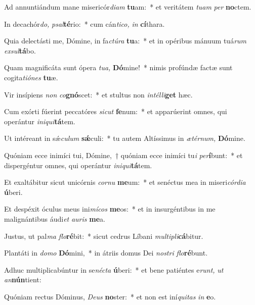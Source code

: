 \item Ad annuntiándum mane misericór\textit{diam} \textbf{tu}am:~* et veritátem \textit{tuam} \textit{per} \textbf{no}ctem.
\item In decachór\textit{do,} \textit{psal}\textbf{té}rio:~* cum cán\textit{tico,} \textit{in} \textbf{cí}thara.
\item Quia delectásti me, Dómine, in fa\textit{ctúra} \textbf{tu}a:~* et in opéribus mánuum tuá\textit{rum} \textit{exsul}\textbf{tá}bo.
\item Quam magnificáta sunt ópera \textit{tua,} \textbf{Dó}mine!~* nimis profúndæ factæ sunt cogita\textit{tiónes} \textbf{tu}æ.
\item Vir insípiens \textit{non} \textit{co}\textbf{gnó}scet:~* et stultus non \textit{intélli}\textbf{get} hæc.
\item Cum exórti fúerint peccatóres \textit{sicut} \textbf{fe}num:~* et apparúerint omnes, qui operántur \textit{iniqui}\textbf{tá}tem.
\item Ut intéreant in sǽ\textit{culum} \textbf{sǽ}culi:~* tu autem Altíssimus in \textit{ætérnum,} \textbf{Dó}mine.
\item Quóniam ecce inimíci tui, Dómine,~† quóniam ecce inimíci tu\textit{i} \textit{per}\textbf{í}bunt:~* et dispergéntur omnes, qui operántur \textit{iniqui}\textbf{tá}tem.
\item Et exaltábitur sicut unicórnis \textit{cornu} \textbf{me}um:~* et senéctus mea in miseri\textit{córdia} \textbf{ú}beri.
\item Et despéxit óculus meus ini\textit{mícos} \textbf{me}os:~* et in insurgéntibus in me malignántibus áudi\textit{et} \textit{auris} \textbf{me}a.
\item Justus, ut pal\textit{ma} \textit{flo}\textbf{ré}bit:~* sicut cedrus Líbani \textit{multipli}\textbf{cá}bitur.
\item Plantáti in \textit{domo} \textbf{Dó}mini,~* in átriis domus Dei \textit{nostri} \textit{flo}\textbf{ré}bunt.
\item Adhuc multiplicabúntur in se\textit{nécta} \textbf{ú}beri:~* et bene patiéntes e\textit{runt,} \textit{ut} \textit{an}\textbf{nún}tient:
\item Quóniam rectus Dóminus, \textit{Deus} \textbf{no}ster:~* et non est iní\textit{quitas} \textit{in} \textbf{e}o.
